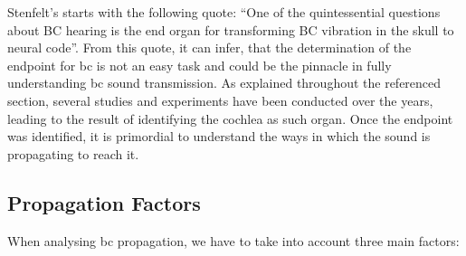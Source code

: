 
Stenfelt's \citep[section 6.1.1]{puria_2013} starts with the following quote: \enquote{One of the quintessential questions about BC hearing is the end organ for
transforming BC vibration in the skull to neural code}. From this quote, it can infer, that the determination of the endpoint for \gls{bc} is not an easy task and could be the pinnacle in fully understanding \gls{bc} sound transmission. As explained throughout the referenced section, several studies and experiments have been conducted over the years, leading to the result of identifying the cochlea as such organ. Once the endpoint was identified, it is primordial to understand the ways in which the sound is propagating to reach it.
\subsection{Propagation Factors}

When analysing \gls{bc} propagation, we have to take into account three main factors:

